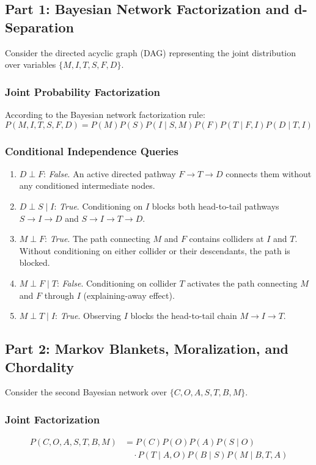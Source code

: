 \documentclass[10pt,journal,compsoc]{IEEEtran}
\begin{document}
\subsection{Part 1: Bayesian Network Factorization and d-Separation}
Consider the directed acyclic graph (DAG) representing the joint distribution over variables $\{M, I, T, S, F, D\}$.

\subsubsection{Joint Probability Factorization}
According to the Bayesian network factorization rule:
\begin{equation}
P(M, I, T, S, F, D) = P(M) P(S) P(I \mid S, M) P(F) P(T \mid F, I) P(D \mid T, I)
\end{equation}

\subsubsection{Conditional Independence Queries}
\begin{enumerate}
    \item \textbf{$D \perp F$}: \textit{False}. An active directed pathway $F \to T \to D$ connects them without any conditioned intermediate nodes.
    \item \textbf{$D \perp S \mid I$}: \textit{True}. Conditioning on $I$ blocks both head-to-tail pathways $S \to I \to D$ and $S \to I \to T \to D$.
    \item \textbf{$M \perp F$}: \textit{True}. The path connecting $M$ and $F$ contains colliders at $I$ and $T$. Without conditioning on either collider or their descendants, the path is blocked.
    \item \textbf{$M \perp F \mid T$}: \textit{False}. Conditioning on collider $T$ activates the path connecting $M$ and $F$ through $I$ (explaining-away effect).
    \item \textbf{$M \perp T \mid I$}: \textit{True}. Observing $I$ blocks the head-to-tail chain $M \to I \to T$.
\end{enumerate}

\subsection{Part 2: Markov Blankets, Moralization, and Chordality}
Consider the second Bayesian network over $\{C, O, A, S, T, B, M\}$.

\subsubsection{Joint Factorization}
\begin{align}
P(C, O, A, S, T, B, M) &= P(C) P(O) P(A) P(S \mid O) \nonumber \\
&\quad \cdot P(T \mid A, O) P(B \mid S) P(M \mid B, T, A)
\end{align}
\end{document}
